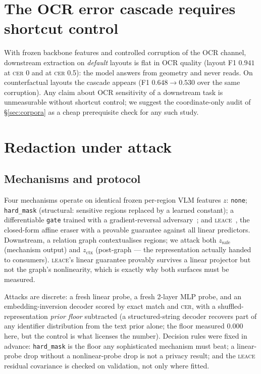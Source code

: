 \documentclass[11pt]{article}
\newcommand{\cer}{\textsc{cer}}
\newcommand{\hardmask}{\texttt{hard\_mask}}
\newcommand{\leace}{\textsc{leace}}
\begin{document}
\section{The OCR error cascade requires shortcut
control}\label{sec:cascade}

With frozen backbone features and controlled corruption of the OCR channel,
downstream extraction on \emph{default} layouts is flat in OCR quality
(layout F1 $0.941$ at \cer{} 0 and at \cer{} 0.5): the model answers from
geometry and never reads. On counterfactual layouts the cascade appears
(F1 $0.648\to0.530$ over the same corruption). Any claim about OCR
sensitivity of a downstream task is unmeasurable without shortcut control;
we suggest the coordinate-only audit of \S\ref{sec:corpora} as a cheap
prerequisite check for any such study.

\section{Redaction under attack}\label{sec:redact}

\subsection{Mechanisms and protocol}

Four mechanisms operate on identical frozen per-region VLM features $z$:
\texttt{none}; \hardmask{} (structural: sensitive regions replaced by a
learned constant); a differentiable \texttt{gate} trained with a
gradient-reversal adversary~\cite{elazar2018adversarial}; and
\leace{}~\cite{belrose2023leace}, the closed-form affine eraser with a
provable guarantee against all linear predictors. Downstream, a relation
graph contextualises regions; we attack both $z_{\text{safe}}$ (mechanism
output) and $z_{\text{ctx}}$ (post-graph --- the representation actually
handed to consumers). \leace{}'s linear guarantee provably survives a linear
projector but not the graph's nonlinearity, which is exactly why both
surfaces must be measured.

Attacks are discrete: a fresh linear probe, a fresh 2-layer MLP probe, and
an embedding-inversion decoder scored by exact match and \cer{}, with a
shuffled-representation \emph{prior floor} subtracted (a structured-string
decoder recovers part of any identifier distribution from the text prior
alone; the floor measured $0.000$ here, but the control is what licenses the
number). Decision rules were fixed in advance: \hardmask{} is the floor any
sophisticated mechanism must beat; a linear-probe drop without a
nonlinear-probe drop is not a privacy result; and the \leace{} residual
covariance is checked on validation, not only where fitted.
\end{document}
